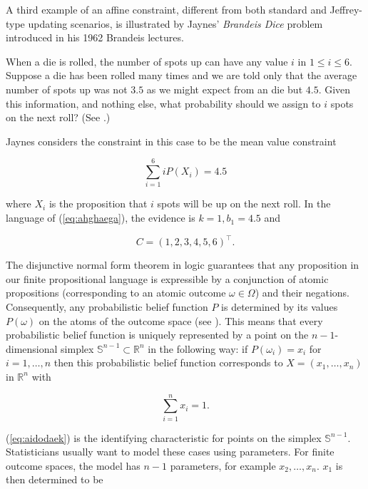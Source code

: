 \documentclass[phd,12pt,oneside]{ubcthesis}
\begin{document}
A third example of an affine constraint, different from both standard
and Jeffrey-type updating scenarios, is illustrated by Jaynes'
\emph{Brandeis Dice} problem introduced in his 1962 Brandeis lectures.

\begin{quotex}
  \label{ex:brandeis} When a die is rolled,
  the number of spots up can have any value $i$ in $1\leq{}i\leq{}6$.
  Suppose a die has been rolled many times and we are told only that
  the average number of spots up was not $3.5$ as we might expect from
  an  die but $4.5$. Given this information, and nothing
  else, what probability should we assign to $i$ spots on the next
  roll? (See .)
\end{quotex}

{\noindent}Jaynes considers the constraint in this case to be the mean value
constraint

\begin{equation}
  \label{eq:thiebaiw}
  \sum_{i=1}^{6}iP(X_{i})=4.5
\end{equation}

{\noindent}where $X_{i}$ is the proposition that $i$ spots will be up on the next
roll. In the language of (\ref{eq:ahghaega}), the evidence is
$k=1,b_{1}=4.5$ and

\begin{equation}
  \label{eq:thaethae}
  C=(1,2,3,4,5,6)^{\intercal}.
\end{equation}

The disjunctive normal form theorem in logic guarantees that any
proposition in our finite propositional language is expressible by a
conjunction of atomic propositions (corresponding to an atomic outcome
$\omega\in\Omega$) and their negations. Consequently, any
probabilistic belief function $P$ is determined by its values
$P(\omega)$ on the atoms of the outcome space (see
). This means that every probabilistic belief
function is uniquely represented by a point on the $n-1$-dimensional
simplex $\mathbb{S}^{n-1}\subset\mathbb{R}^{n}$ in the following way:
if $P(\omega_{i})=x_{i}$ for $i=1,\ldots,n$ then this probabilistic
belief function corresponds to $X=(x_{1},\ldots,x_{n})$ in
$\mathbb{R}^{n}$ with 

\begin{equation}
  \label{eq:aidodaek}
  \sum_{i=1}^{n}x_{i}=1.
\end{equation}

{\noindent}(\ref{eq:aidodaek}) is the identifying characteristic for points on
the simplex $\mathbb{S}^{n-1}$. Statisticians usually want to model
these cases using parameters. For finite outcome spaces, the model has
$n-1$ parameters, for example $x_{2},\ldots,x_{n}$. $x_{1}$ is then
determined to be
\end{document}
